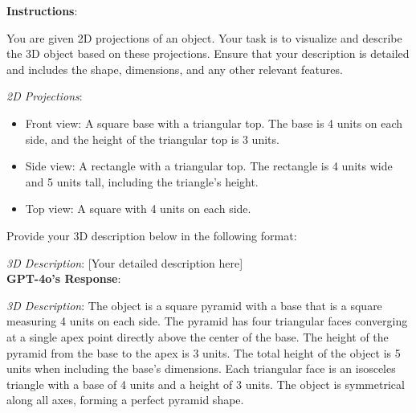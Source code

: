 \begin{tcolorbox}[breakable,boxrule=0.5pt,sharp corners,fontupper=\small,
colback=green!10, colframe=green!50!black, title={Success: Creative Card Game Rules}]
\end{tcolorbox}

\begin{tcolorbox}[breakable,boxrule=0.5pt,sharp corners,fontupper=\small,
colback=green!10, colframe=green!50!black, title={Success: Detailed 3D Object Description from 2D Projections}]
\textbf{Instructions}:

You are given 2D projections of an object. Your task is to visualize and describe the 3D object based on these projections. Ensure that your description is detailed and includes the shape, dimensions, and any other relevant features.

\textit{2D Projections}:
\begin{itemize}
    \item Front view: A square base with a triangular top. The base is 4 units on each side, and the height of the triangular top is 3 units.
    \item Side view: A rectangle with a triangular top. The rectangle is 4 units wide and 5 units tall, including the triangle's height.
    \item Top view: A square with 4 units on each side.
\end{itemize}

Provide your 3D description below in the following format:

\textit{3D Description}: [Your detailed description here]\\

\textbf{GPT-4o's Response}:

\textit{3D Description}: The object is a square pyramid with a base that is a square measuring 4 units on each side. The pyramid has four triangular faces converging at a single apex point directly above the center of the base. The height of the pyramid from the base to the apex is 3 units. The total height of the object is 5 units when including the base's dimensions. Each triangular face is an isosceles triangle with a base of 4 units and a height of 3 units. The object is symmetrical along all axes, forming a perfect pyramid shape.
\end{tcolorbox}

